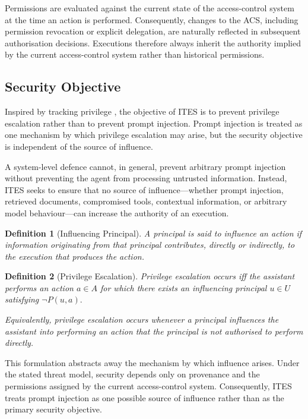 \documentclass{article} %
\newtheorem{definition}{Definition}
\begin{document}
Permissions are evaluated against the current state of the access-control system at the time an action is performed. Consequently, changes to the ACS, including permission revocation or explicit delegation, are naturally reflected in subsequent authorisation decisions. Executions therefore always inherit the authority implied by the current access-control system rather than historical permissions.

\subsection{Security Objective}

Inspired by tracking privilege \cite{provos2003preventing, davi2010privilege}, the objective of ITES is to prevent privilege escalation rather than to prevent prompt injection. Prompt injection is treated as one mechanism by which privilege escalation may arise, but the security objective is independent of the source of influence.

A system-level defence cannot, in general, prevent arbitrary prompt injection without preventing the agent from processing untrusted information. Instead, ITES seeks to ensure that no source of influence---whether prompt injection, retrieved documents, compromised tools, contextual information, or arbitrary model behaviour---can increase the authority of an execution.

\begin{definition}[Influencing Principal]
A principal is said to influence an action if information originating from that principal contributes, directly or indirectly, to the execution that produces the action.
\end{definition}

\begin{definition}[Privilege Escalation]
Privilege escalation occurs iff the assistant performs an action \(a \in A\) for which there exists an influencing principal \(u \in U\) satisfying \(\neg P(u,a).\)

Equivalently, privilege escalation occurs whenever a principal influences the assistant into performing an action that the principal is not authorised to perform directly.
\end{definition}

This formulation abstracts away the mechanism by which influence arises. Under the stated threat model, security depends only on provenance and the permissions assigned by the current access-control system. Consequently, ITES treats prompt injection as one possible source of influence rather than as the primary security objective.
\end{document}

